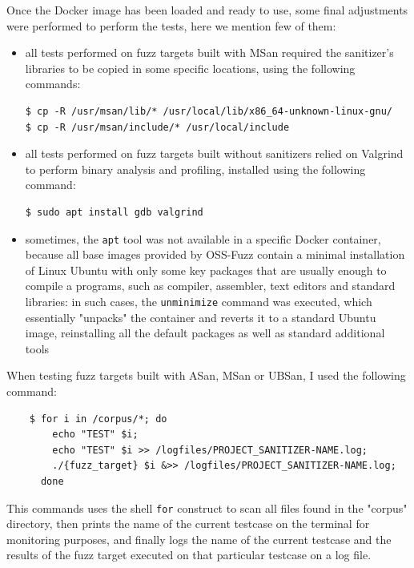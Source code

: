 Once the Docker image has been loaded and ready to use, some final adjustments were performed to perform the tests, here we mention few of them:
\begin{itemize}
    \item all tests performed on fuzz targets built with MSan required the sanitizer's libraries to be copied in some specific locations, using the following commands:
\begin{verbatim}
$ cp -R /usr/msan/lib/* /usr/local/lib/x86_64-unknown-linux-gnu/
$ cp -R /usr/msan/include/* /usr/local/include
\end{verbatim}
    \item all tests performed on fuzz targets built without sanitizers relied on Valgrind to perform binary analysis and profiling, installed using the following command:
\begin{verbatim}
$ sudo apt install gdb valgrind
\end{verbatim}
    \item sometimes, the \verb|apt| tool was not available in a specific Docker container, because all base images provided by OSS-Fuzz contain a minimal installation of Linux Ubuntu with only some key packages that are usually enough to compile a programs, such as compiler, assembler, text editors and standard libraries: in such cases, the \verb|unminimize| command was executed, which essentially "unpacks" the container and reverts it to a standard Ubuntu image, reinstalling all the default packages as well as standard additional tools
\end{itemize}












\newpage
When testing fuzz targets built with ASan, MSan or UBSan, I used the following command:
\begin{verbatim}
    $ for i in /corpus/*; do 
        echo "TEST" $i; 
        echo "TEST" $i >> /logfiles/PROJECT_SANITIZER-NAME.log; 
        ./{fuzz_target} $i &>> /logfiles/PROJECT_SANITIZER-NAME.log; 
      done
\end{verbatim}

This commands uses the shell \verb|for| construct to scan all files found in the "corpus" directory, then prints the name of the current testcase on the terminal for monitoring purposes, and finally logs the name of the current testcase and the results of the fuzz target executed on that particular testcase on a log file.


